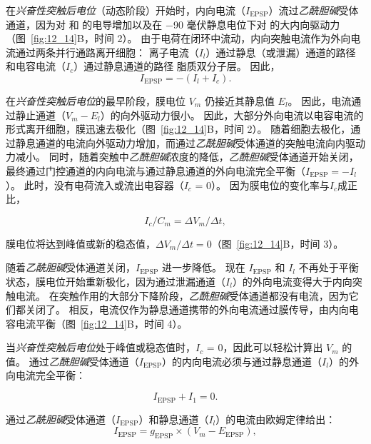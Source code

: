 在\textit{兴奋性突触后电位}（动态阶段）开始时，内向电流（$I_{\text{EPSP}}$）流过\textit{乙酰胆碱}受体通道，因为对  和  的电导增加以及在 −90 毫伏静息电位下对  的大内向驱动力 （图~\ref{fig:12_14}B，时间 2）。
由于电荷在闭环中流动，内向突触电流作为外向电流通过两条并行通路离开细胞：
离子电流（$ I_l $）通过静息（或泄漏）通道的路径和电容电流（$ I_c $）通过静息通道的路径 脂质双分子层。
因此，
\begin{equation}\label{ionic_current}
	I_{\text{EPSP}} = -(I_l + I_c).
\end{equation}

在\textit{兴奋性突触后电位}的最早阶段，膜电位 $V_m$ 仍接近其静息值 $ E_l $。
因此，电流通过静止通道（$V_m - E_l$）的向外驱动力很小。
因此，大部分外向电流以电容电流的形式离开细胞，膜迅速去极化（图~\ref{fig:12_14}B，时间 2）。 
随着细胞去极化，通过静息通道的电流向外驱动力增加，而通过\textit{乙酰胆碱}受体通道的突触电流向内驱动力减小。
同时，随着突触中\textit{乙酰胆碱}浓度的降低，\textit{乙酰胆碱}受体通道开始关闭，最终通过门控通道的内向电流与通过静息通道的外向电流完全平衡（$I_{\text{EPSP}} = - I_l$）。
此时，没有电荷流入或流出电容器（$ I_c $ = 0）。
因为膜电位的变化率与$ I_c $成正比，


\begin{equation}\label{rate_potential}
	I_c / C_m = \Delta V_m / \Delta t,
\end{equation}

膜电位将达到峰值或新的稳态值，$\Delta V_m / \Delta t = 0 $（图~\ref{fig:12_14}B，时间 3）。


随着\textit{乙酰胆碱}受体通道关闭，$I_{\text{EPSP}}$ 进一步降低。
现在 $I_{\text{EPSP}}$ 和 $ I_l $ 不再处于平衡状态，膜电位开始重新极化，因为通过泄漏通道（$ I_l $）的外向电流变得大于内向突触电流。
在突触作用的大部分下降阶段，\textit{乙酰胆碱}受体通道都没有电流，因为它们都关闭了。
相反，电流仅作为静息通道携带的外向电流通过膜传导，由内向电容电流平衡（图~\ref{fig:12_14}B，时间 4）。


当\textit{兴奋性突触后电位}处于峰值或稳态值时，$ I_c $ = 0，因此可以轻松计算出 $V_m$ 的值。
通过\textit{乙酰胆碱}受体通道（$I_{\text{EPSP}}$）的内向电流必须与通过静息通道（$ I_l $）的外向电流完全平衡：


\begin{equation}\label{eq:12_outward_current}
	I_{\text{EPSP}} + I_1 = 0.
\end{equation}


通过\textit{乙酰胆碱}受体通道（$I_{\text{EPSP}}$）和静息通道（$ I_l $）的电流由欧姆定律给出：
\begin{equation}\label{eq:12_current_EPSP}
	I_{\text{EPSP}} = g_{\text{EPSP}} \times (V_m - E_{\text{EPSP}}),
\end{equation}

